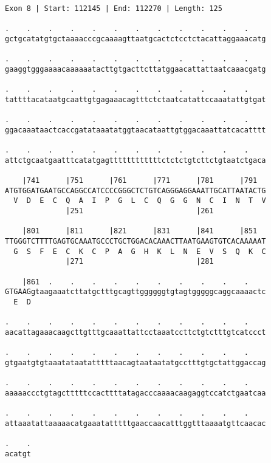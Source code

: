 \documentclass{article}
\begin{document}
\newpage
\begin{Verbatim}
Exon 8 | Start: 112145 | End: 112270 | Length: 125
 
.    .    .    .    .    .    .    .    .    .    .    .    
gctgcatatgtgctaaaacccgcaaaagttaatgcactctcctctacattaggaaacatg
  
.    .    .    .    .    .    .    .    .    .    .    .    
gaaggtgggaaaacaaaaaatacttgtgacttcttatggaacattattaatcaaacgatg
  
.    .    .    .    .    .    .    .    .    .    .    .    
tattttacataatgcaattgtgagaaacagtttctctaatcatattccaaatattgtgat
  
.    .    .    .    .    .    .    .    .    .    .    .    
ggacaaataactcaccgatataaatatggtaacataattgtggacaaattatcacatttt
  
.    .    .    .    .    .    .    .    .    .    .    .    
attctgcaatgaatttcatatgagttttttttttttctctctgtcttctgtaatctgaca
  
    |741      |751      |761      |771      |781      |791  
ATGTGGATGAATGCCAGGCCATCCCCGGGCTCTGTCAGGGAGGAAATTGCATTAATACTG
  V  D  E  C  Q  A  I  P  G  L  C  Q  G  G  N  C  I  N  T  V
              |251                          |261            
  
    |801      |811      |821      |831      |841      |851  
TTGGGTCTTTTGAGTGCAAATGCCCTGCTGGACACAAACTTAATGAAGTGTCACAAAAAT
  G  S  F  E  C  K  C  P  A  G  H  K  L  N  E  V  S  Q  K  C
              |271                          |281            
  
    |861  .    .    .    .    .    .    .    .    .    .    
GTGAAGgtaagaaatcttatgctttgcagttggggggtgtagtgggggcaggcaaaactc
  E  D                                                      
  
.    .    .    .    .    .    .    .    .    .    .    .    
aacattagaaacaagcttgtttgcaaattattcctaaatccttctgtctttgtcatccct
  
.    .    .    .    .    .    .    .    .    .    .    .    
gtgaatgtgtaaatataatatttttaacagtaataatatgcctttgtgctattggaccag
  
.    .    .    .    .    .    .    .    .    .    .    .    
aaaaaccctgtagctttttccacttttatagacccaaaacaagaggtccatctgaatcaa
  
.    .    .    .    .    .    .    .    .    .    .    .    
attaaatattaaaaacatgaaatatttttgaaccaacatttggtttaaaatgttcaacac
  
.    .
acatgt
\end{Verbatim}
\newpage
\end{document}
